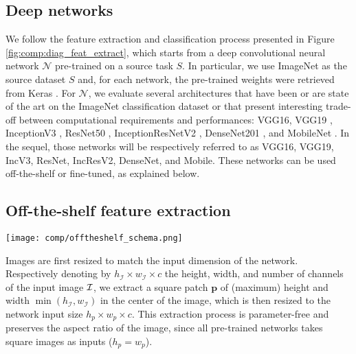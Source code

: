 \subsection{Deep networks}
We follow the feature extraction and classification process presented in Figure \ref{fig:comp:diag_feat_extract}, which starts from a deep convolutional neural network $\mathcal{N}$ pre-trained on a source task $S$. In particular, we use ImageNet as the source dataset $S$ and, for each network, the pre-trained weights were retrieved from Keras \parencite{chollet2015keras}. For $\mathcal{N}$, we evaluate several architectures that have been or are state of the art on the ImageNet classification dataset \parencite{deng2009imagenet} or that present interesting trade-off between computational requirements and performances: VGG16, VGG19 \parencite{simonyan2014very}, InceptionV3 \parencite{szegedy2016rethinking}, ResNet50 \parencite{he2016deep}, InceptionResNetV2 \parencite{szegedy2017inception}, DenseNet201 \parencite{huang2017densely}, and MobileNet \parencite{howard2017mobilenets}. In the sequel, those networks will be respectively referred to as VGG16, VGG19, IncV3, ResNet, IncResV2, DenseNet, and Mobile. These networks can be used off-the-shelf or fine-tuned, as explained below.

\subsection{Off-the-shelf feature extraction}

 \begin{figure*}
   \center
   \texttt{[image: comp/offtheshelf\_schema.png]}
     \caption{Feature extraction from pre-trained convolutional neural networks}
     \label{fig:comp:diag_feat_extract}
 \end{figure*}


Images are first resized to match the input dimension of the network. Respectively denoting by $h_{\mathcal{I}} \times w_{\mathcal{I}} \times c$ the height, width, and number of channels of the input image ${\cal I}$, we extract a square patch $\mathbf{p}$ of (maximum) height and width $\min(h_{\mathcal{I}}, w_{\mathcal{I}})$ in the center of the image, which is then resized to the network input size $h_p\times w_p\times c$. This extraction process is parameter-free and preserves the aspect ratio of the image, since all pre-trained networks takes square images as inputs (\ie $h_p=w_p$).


